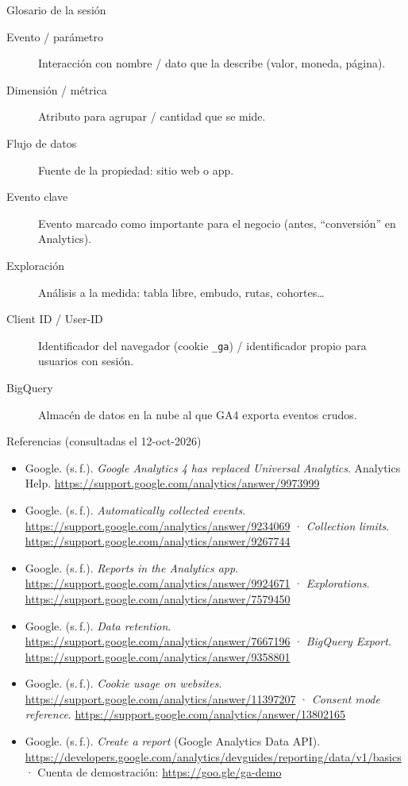 \documentclass[aspectratio=169,xcolor=dvipsnames]{beamer}
\begin{document}
\begin{frame}{Glosario de la sesión}
\scriptsize
\begin{description}
  \item[Evento / parámetro] Interacción con nombre / dato que la describe (valor, moneda, página).
  \item[Dimensión / métrica] Atributo para agrupar / cantidad que se mide.
  \item[Flujo de datos] Fuente de la propiedad: sitio web o app.
  \item[Evento clave] Evento marcado como importante para el negocio (antes, \enquote{conversión} en Analytics).
  \item[Exploración] Análisis a la medida: tabla libre, embudo, rutas, cohortes\ldots
  \item[Client ID / User-ID] Identificador del navegador (cookie \texttt{\_ga}) / identificador propio para usuarios con sesión.
  \item[BigQuery] Almacén de datos en la nube al que GA4 exporta eventos crudos.
\end{description}
\end{frame}

\begin{frame}{Referencias (consultadas el 12-oct-2026)}
\tiny
\begin{itemize}
  \item[] Google. (s.\,f.). \textit{Google Analytics 4 has replaced Universal Analytics}. Analytics Help. \url{https://support.google.com/analytics/answer/9973999}
  \item[] Google. (s.\,f.). \textit{Automatically collected events}. \url{https://support.google.com/analytics/answer/9234069} · \textit{Collection limits}. \url{https://support.google.com/analytics/answer/9267744}
  \item[] Google. (s.\,f.). \textit{Reports in the Analytics app}. \url{https://support.google.com/analytics/answer/9924671} · \textit{Explorations}. \url{https://support.google.com/analytics/answer/7579450}
  \item[] Google. (s.\,f.). \textit{Data retention}. \url{https://support.google.com/analytics/answer/7667196} · \textit{BigQuery Export}. \url{https://support.google.com/analytics/answer/9358801}
  \item[] Google. (s.\,f.). \textit{Cookie usage on websites}. \url{https://support.google.com/analytics/answer/11397207} · \textit{Consent mode reference}. \url{https://support.google.com/analytics/answer/13802165}
  \item[] Google. (s.\,f.). \textit{Create a report} (Google Analytics Data API). \url{https://developers.google.com/analytics/devguides/reporting/data/v1/basics} · Cuenta de demostración: \url{https://goo.gle/ga-demo}
\end{itemize}
\end{frame}
\end{document}
